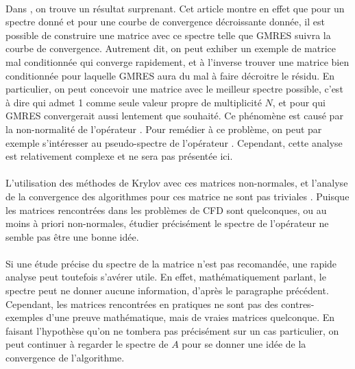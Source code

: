 		\paragraph{}
		Dans \cite{GreenbaumPtakStrakos1996}, on trouve un résultat surprenant.
		Cet article montre en effet que pour un spectre donné et pour une courbe de convergence décroissante donnée, il est possible de construire une matrice avec ce spectre telle que GMRES suivra la courbe de convergence.
		Autrement dit, on peut exhiber un exemple de matrice mal conditionnée qui converge rapidement, et à l'inverse trouver une matrice bien conditionnée pour laquelle GMRES aura du mal à faire décroitre le résidu.
		En particulier, on peut concevoir une matrice avec le meilleur spectre possible, c'est à dire qui admet 1 comme seule valeur propre de multiplicité $N$, et pour qui GMRES convergerait aussi lentement que souhaité.
		Ce phénomène est causé par la non-normalité de l'opérateur \cite{GreenbaumStrakos1994, GreenbaumPtakStrakos1996}.
		Pour remédier à ce problème, on peut par exemple s'intéresser au pseudo-spectre de l'opérateur \cite{Trefethen1999}.
		Cependant, cette analyse est relativement complexe et ne sera pas présentée ici.

		\paragraph{}
		L'utilisation des méthodes de Krylov avec ces matrices non-normales, et l'analyse de la convergence des algorithmes pour ces matrice ne sont pas triviales \cite{LiesenTichy2004, Huhtanen2005}.
		Puisque les matrices rencontrées dans les problèmes de CFD sont quelconques, ou au moins à priori non-normales, étudier précisément le spectre de l'opérateur ne semble pas être une bonne idée.

		\paragraph{}
		Si une étude précise du spectre de la matrice n'est pas recomandée, une rapide analyse peut toutefois s'avérer utile.
		En effet, mathématiquement parlant, le spectre peut ne donner aucune information, d'après le paragraphe précédent.
		Cependant, les matrices rencontrées en pratiques ne sont pas des contres-exemples d'une preuve mathématique, mais de vraies matrices quelconque.
		En faisant l'hypothèse qu'on ne tombera pas précisément sur un cas particulier, on peut continuer à regarder le spectre de $A$ pour se donner une idée de la convergence de l'algorithme.

